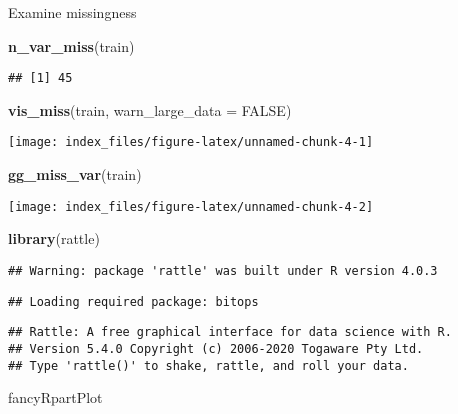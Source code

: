 \documentclass[]{tufte-handout}
\newenvironment{Shaded}{}{}
\newcommand{\DataTypeTok}[1]{\textcolor[rgb]{0.56,0.13,0.00}{#1}}
\newcommand{\KeywordTok}[1]{\textcolor[rgb]{0.00,0.44,0.13}{\textbf{#1}}}
\newcommand{\NormalTok}[1]{#1}
\newcommand{\OtherTok}[1]{\textcolor[rgb]{0.00,0.44,0.13}{#1}}
\begin{document}
Examine missingness

\begin{Shaded}
\begin{Highlighting}[]
\KeywordTok{n_var_miss}\NormalTok{(train)}
\end{Highlighting}
\end{Shaded}

\begin{verbatim}
## [1] 45
\end{verbatim}

\begin{Shaded}
\begin{Highlighting}[]
\KeywordTok{vis_miss}\NormalTok{(train, }
         \DataTypeTok{warn_large_data =} \OtherTok{FALSE}\NormalTok{)}
\end{Highlighting}
\end{Shaded}

\texttt{[image: index\_files/figure-latex/unnamed-chunk-4-1]}

\begin{Shaded}
\begin{Highlighting}[]
\KeywordTok{gg_miss_var}\NormalTok{(train)}
\end{Highlighting}
\end{Shaded}

\texttt{[image: index\_files/figure-latex/unnamed-chunk-4-2]}

\begin{Shaded}
\begin{Highlighting}[]
\KeywordTok{library}\NormalTok{(rattle)}
\end{Highlighting}
\end{Shaded}

\begin{verbatim}
## Warning: package 'rattle' was built under R version 4.0.3
\end{verbatim}

\begin{verbatim}
## Loading required package: bitops
\end{verbatim}

\begin{verbatim}
## Rattle: A free graphical interface for data science with R.
## Version 5.4.0 Copyright (c) 2006-2020 Togaware Pty Ltd.
## Type 'rattle()' to shake, rattle, and roll your data.
\end{verbatim}

\begin{Shaded}
\begin{Highlighting}[]
\NormalTok{fancyRpartPlot}
\end{Highlighting}
\end{Shaded}
\end{document}
